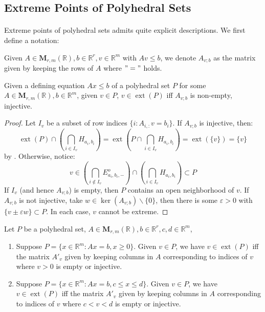 \subsection{Extreme Points of Polyhedral Sets}

\paragraph{}Extreme points of polyhedral sets admits quite explicit descriptions. We first define a notation:

\begin{defn}\label{defn:017-submatrix}
	Given $A\in \mathbf{M}_{r,m}(\mathbb{R}),b\in \mathbb{R}^r,v\in \mathbb{R}^m$ with $Av\leq b$, we denote $A_{v; b}$ as the matrix given by keeping the rows of $A$ where $"="$ holds.
\end{defn}

\begin{prop}\label{prop:017-characterization-polyhedral-extreme}
	Given a defining equation $Ax\leq b$ of a polyhedral set $P$ for some $A\in \mathbf{M}_{r,m}(\mathbb{R}),b\in \mathbb{R}^m$, given $v\in P$, $v\in \operatorname{ext}(P)$ iff $A_{v; b}$ is non-empty, injective.
\end{prop}

\begin{proof}
	Let $I_v$ be a subset of row indices $\{i:A_{i,:}v=b_i\}$. If $A_{v; b}$ is injective, then:
	\[
		\operatorname{ext}(P)\cap\left(\bigcap_{i\in I_v}H_{a_i,b_i}\right)=
		\operatorname{ext}\left(P\cap\bigcap_{i\in I_v}H_{a_i,b_i}\right)=\operatorname{ext}\left(\{v\}\right)=\{v\}
	\]
	by . Otherwise, notice:
	\[
		v\in\left(\bigcap_{i\notin I_v}E_{a_i,b_i,-}^o\right)\cap\left(\bigcap_{i\in I_v}H_{a_i,b_i}\right)\subset P
	\]
	If $I_v$ (and hence $A_{v;b}$) is empty, then $P$ contains an open neighborhood of $v$. If $A_{v;b}$ is not injective, take $w\in \operatorname{ker}(A_{v;b})\smallsetminus\{0\}$, then there is some $\varepsilon >0$ with $\{v\pm \varepsilon w\}\subset P$. In each case, $v$ cannot be extreme.
\end{proof}

\begin{coro}[Variants]\label{coro:017-char-variants}
	Let $P$ be a polyhedral set, $A\in \mathbf{M}_{r,m}(\mathbb{R}),b\in \mathbb{R}^r,c,d\in \mathbb{R}^m$,
	\begin{enumerate}[label=(\alph*)]
		\item Suppose $P=\{x\in \mathbb{R}^m:Ax=b,x\geq 0\}$. Given $v\in P$, we have $v\in \operatorname{ext}(P)$ iff the matrix $A'_v$ given by keeping columns in $A$ corresponding to indices of $v$ where $v> 0$ is empty or injective.
		\item Suppose $P=\{x\in \mathbb{R}^m:Ax=b,c\leq x\leq d\}$. Given $v\in P$, we have $v\in \operatorname{ext}(P)$ iff the matrix $A'_v$ given by keeping columns in $A$ corresponding to indices of $v$ where $c<v<d$ is empty or injective.
	\end{enumerate}
\end{coro}

